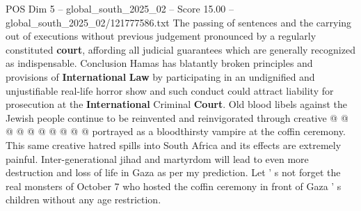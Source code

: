 \begin{textsample}{POS Dim 5 – global\_south\_2025\_02 – Score 15.00 – global\_south\_2025\_02/121777586.txt}
The passing of sentences and the carrying out of executions without previous judgement pronounced by a regularly constituted \textbf{court}, affording all judicial guarantees which are generally recognized as indispensable.
Conclusion Hamas has blatantly broken principles and provisions of \textbf{International} \textbf{Law} by participating in an undignified and unjustifiable real-life horror show and such conduct could attract liability for prosecution at the \textbf{International} Criminal \textbf{Court}.
Old blood libels against the Jewish people continue to be reinvented and reinvigorated through creative @ @ @ @ @ @ @ @ @ @ portrayed as a bloodthirsty vampire at the coffin ceremony.
This same creative hatred spills into South Africa and its effects are extremely painful.
Inter-generational jihad and martyrdom will lead to even more destruction and loss of life in Gaza as per my prediction.
Let ' s not forget the real monsters of October 7 who hosted the coffin ceremony in front of Gaza ' s children without any age restriction.

\end{textsample}
